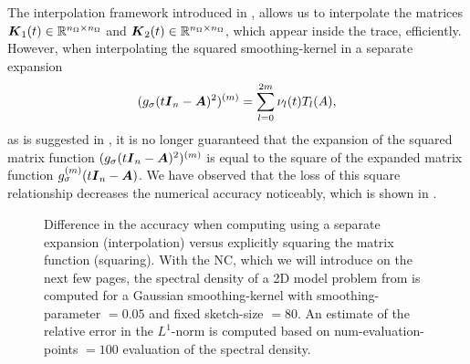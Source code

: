 The interpolation framework introduced in ,
allows us to interpolate the matrices $\boldsymbol{K}_1(t) \in \mathbb{R}^{n_{\Omega} \times n_{\Omega}}$
and $\boldsymbol{K}_2(t) \in \mathbb{R}^{n_{\Omega} \times n_{\Omega}}$,
which appear inside the trace, efficiently.
However, when interpolating the
squared \gls{smoothing-kernel} in a separate expansion
\begin{equation}
    (g_{\sigma}(t\boldsymbol{I}_n - \boldsymbol{A})^2)^{(m)} = \sum_{l=0}^{2m} \nu_l(t) T_l(A),
    \label{equ:3-nystrom-ESS-chebyshev-expansion}
\end{equation}
as is suggested in \cite{lin2017randomized}, it is no longer guaranteed that
the expansion of the squared matrix function $(g_{\sigma}(t\boldsymbol{I}_n - \boldsymbol{A})^2)^{(m)}$
is equal to the square of the expanded matrix function $g_{\sigma}^{(m)}(t\boldsymbol{I}_n - \boldsymbol{A})$.
We have observed that the loss of this square relationship
decreases the numerical accuracy noticeably, which is
shown in .\\
\begin{figure}[ht]
    \centering
    
    \caption{Difference in the accuracy when computing 
        using a separate expansion (interpolation) versus explicitly squaring
        the matrix function (squaring). With the \gls{NC}, which we will introduce
        on the next few pages, the spectral density of a 2D model problem from
        is computed for a Gaussian \gls{smoothing-kernel} with \gls{smoothing-parameter} $=0.05$
        and fixed \gls{sketch-size} $=80$. An estimate of the relative error
        in the $L^1$-norm is computed based on \gls{num-evaluation-points} $=100$
        evaluation of the spectral density.}
    \label{fig:3-nystrom-interpolation-issue}
\end{figure}

